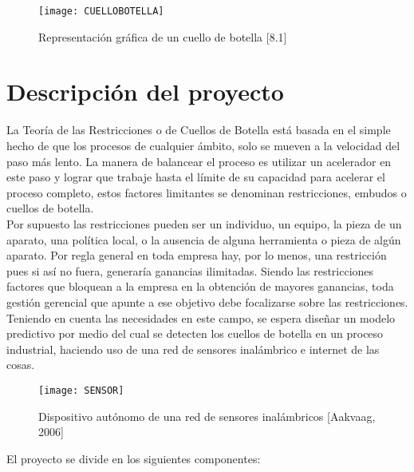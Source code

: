 \documentclass[10pt]{article}   			%
\begin{document}
\begin{figure}[ht] 
	\centering
		\texttt{[image: CUELLOBOTELLA]}   
	\caption{Representación gráfica de un cuello de botella [8.1]} \label{fig:CUELLO}
\end{figure}
		
\section{Descripción del proyecto}

La Teoría de las Restricciones o de Cuellos de Botella está basada en el simple hecho de que los procesos de cualquier ámbito, solo se mueven a la velocidad del paso más lento. La manera de balancear el proceso es utilizar un acelerador en este paso y lograr que trabaje hasta el límite de su capacidad para acelerar el proceso completo, estos factores limitantes se denominan restricciones, embudos o cuellos de botella. \\

Por supuesto las restricciones pueden ser un individuo, un equipo, la pieza de un aparato, una política local, o la ausencia de alguna herramienta o pieza de algún aparato. Por regla general en toda empresa hay, por lo menos, una restricción pues si así no fuera, generaría ganancias ilimitadas. Siendo las restricciones factores que bloquean a la empresa en la obtención de mayores ganancias, toda gestión gerencial que apunte a ese objetivo debe focalizarse sobre las restricciones.\\

Teniendo en cuenta las necesidades en este campo, se espera diseñar un modelo predictivo por medio del cual se detecten los cuellos de botella en un proceso industrial, haciendo uso de una red de sensores inalámbrico e internet de las cosas.

\begin{figure}[ht] 
	\centering
		\texttt{[image: SENSOR]}   
	\caption{Dispositivo autónomo de una red de sensores inalámbricos [Aakvaag, 2006]} \label{fig:SENSOR}
\end{figure}

El proyecto se divide en los siguientes componentes:
		
\end{document}
